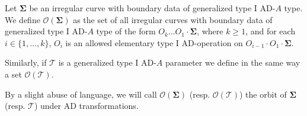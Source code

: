 \documentclass[11pt,a4paper]{amsart}
\numberwithin{equation}{section}
\begin{document}
\begin{definition}

Let $\bm\Sigma$ be an irregular curve with boundary data of generalized type I AD-$A$ type. We define $\mathcal O(\bm\Sigma)$ as the set of all irregular curves with boundary data of generalized type I AD-$A$ type of the form $O_k\dots O_1\cdot \bm\Sigma$, where $k\geq 1$, and for each $i\in \{1, \dots, k\}$, $O_i$ is an allowed elementary  type I AD-operation on $O_{i-1}\cdot O_1\cdot \bm\Sigma$. 

Similarly, if $\mathcal T$ is a generalized type I AD-$A$ parameter we define in the same way a set $\mathcal O(\mathcal T)$.
\end{definition}

By a slight abuse of language, we will call $\mathcal O(\bm\Sigma)$ (resp. $\mathcal O(\mathcal T)$) the orbit of $\bm\Sigma$ (resp. $\mathcal T$) under AD transformations.
\end{document}
